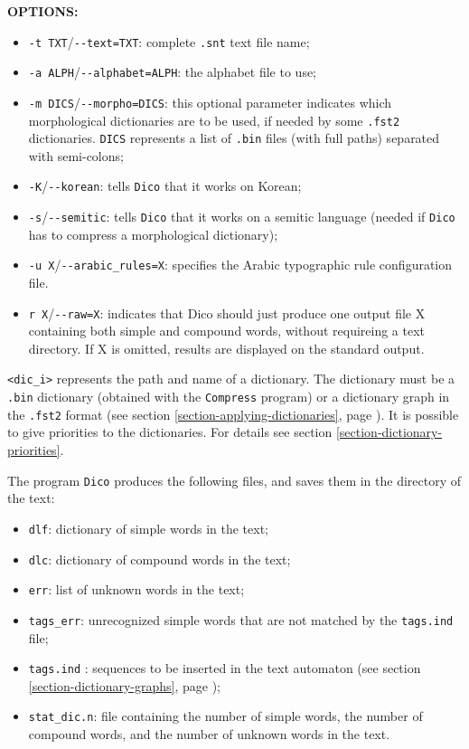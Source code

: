 \bigskip
\noindent \textbf{OPTIONS:}
\begin{itemize}
  \item \verb+-t TXT+/\verb+--text=TXT+: complete \verb+.snt+ text file name;
  \item \verb+-a ALPH+/\verb+--alphabet=ALPH+: the alphabet file to use;
  \item \verb+-m DICS+/\verb+--morpho=DICS+: this optional parameter indicates
  which morphological dictionaries are to be used, if needed by some \verb+.fst2+
  dictionaries. \verb+DICS+ represents a list of \verb+.bin+ files (with full
  paths) separated with semi-colons;
  \item \verb+-K+/\verb+--korean+: tells \verb$Dico$ that it works on Korean;
  \item \verb+-s+/\verb+--semitic+: tells \verb$Dico$ that it works on a semitic language (needed 
  if \verb$Dico$ has to compress a morphological dictionary);
  \item \verb+-u X+/\verb+--arabic_rules=X+: specifies the Arabic typographic rule configuration file.
  \item \verb+r X+/\verb+--raw=X+: indicates that Dico should just produce one
  output file X containing both simple and compound words, without requireing a
  text directory. If X is omitted, results are displayed on the standard output.

 
\end{itemize}

\bigskip
\noindent
\verb+<dic_i>+ represents the path and name of
a dictionary. The dictionary must be a \verb+.bin+ dictionary (obtained with 
the \verb+Compress+ program) or a dictionary graph in the \verb+.fst2+ format (see section
\ref{section-applying-dictionaries}, page \pageref{section-applying-dictionaries}).
It is possible to give priorities to the dictionaries. For details see 
section \ref{section-dictionary-priorities}.

\bigskip
\noindent The program \verb+Dico+ produces the following files, and saves
them in the directory of the text:

\begin{itemize}
  \item \verb+dlf+: dictionary of simple words in the text;
  \item \verb+dlc+: dictionary of compound words in the text;
  \item \verb+err+: list of unknown words in the text;
  \item \verb+tags_err+: unrecognized simple words that are not matched by the \verb+tags.ind+ file;
  \item \verb+tags.ind+ : sequences to be inserted in the text automaton
  (see section \ref{section-dictionary-graphs}, page \pageref{section-dictionary-graphs});
  \item \verb+stat_dic.n+: file containing the number of simple words, the number
  of compound words, and the number of unknown words in the text.
\end{itemize}

